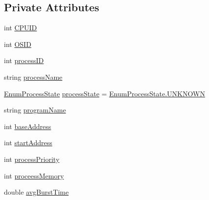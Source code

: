 \subsection*{Private Attributes}
\begin{DoxyCompactItemize}
\item 
int \hyperlink{class_c_p_u___o_s___simulator_1_1_operating___system_1_1_process_control_block_abb9341cb0d47b6acb52a4f219d69b600}{C\+P\+U\+I\+D}
\item 
int \hyperlink{class_c_p_u___o_s___simulator_1_1_operating___system_1_1_process_control_block_a417b892bfe8ec7f9d5a64eb413b2a333}{O\+S\+I\+D}
\item 
int \hyperlink{class_c_p_u___o_s___simulator_1_1_operating___system_1_1_process_control_block_a238d1021130eef6ea4031679338e4719}{process\+I\+D}
\item 
string \hyperlink{class_c_p_u___o_s___simulator_1_1_operating___system_1_1_process_control_block_af5ec02be59157c998f2e708bc8b27b59}{process\+Name}
\item 
\hyperlink{namespace_c_p_u___o_s___simulator_1_1_operating___system_a836ee2204e78fcb3a7dd6c3c942b1a24}{Enum\+Process\+State} \hyperlink{class_c_p_u___o_s___simulator_1_1_operating___system_1_1_process_control_block_a8aaf7c8cbb6b9ed7b4bb4194aa85cf92}{process\+State} = \hyperlink{namespace_c_p_u___o_s___simulator_1_1_operating___system_aea0b669d1bbf5690ae34ac2f8bef9470a696b031073e74bf2cb98e5ef201d4aa3}{Enum\+Process\+State.\+U\+N\+K\+N\+O\+W\+N}
\item 
string \hyperlink{class_c_p_u___o_s___simulator_1_1_operating___system_1_1_process_control_block_a0b041598cd53af2daee0f2a78cc1a012}{program\+Name}
\item 
int \hyperlink{class_c_p_u___o_s___simulator_1_1_operating___system_1_1_process_control_block_aa539c0c08de4523f8d6e9b21fe4165e6}{base\+Address}
\item 
int \hyperlink{class_c_p_u___o_s___simulator_1_1_operating___system_1_1_process_control_block_a4898c5e44f50c89467d3fe35486face7}{start\+Address}
\item 
int \hyperlink{class_c_p_u___o_s___simulator_1_1_operating___system_1_1_process_control_block_af07e4fc7da3435e5513b842fc177b677}{process\+Priority}
\item 
int \hyperlink{class_c_p_u___o_s___simulator_1_1_operating___system_1_1_process_control_block_afb21210abfe66fa59efd3fbc7cd6d556}{proceess\+Memory}
\item 
double \hyperlink{class_c_p_u___o_s___simulator_1_1_operating___system_1_1_process_control_block_afec04aefe69def148099512dc2024ded}{avg\+Burst\+Time}

\end{DoxyCompactItemize}

